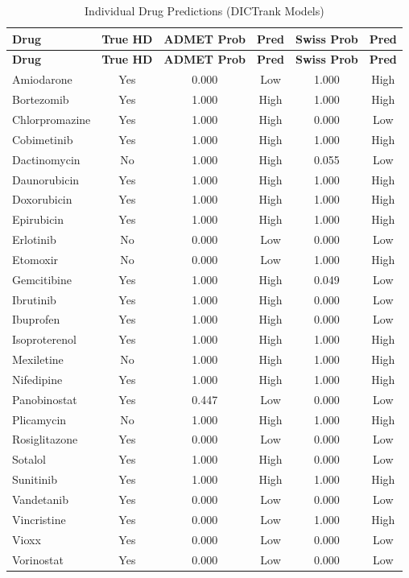 \documentclass[11pt]{article}
\begin{document}
\begin{longtable}{lccccc}
\caption{Individual Drug Predictions (DICTrank Models)} \\
\toprule
\textbf{Drug} & \textbf{True HD} & \textbf{ADMET Prob} & \textbf{Pred} & \textbf{Swiss Prob} & \textbf{Pred} \\
\midrule
\endfirsthead
\toprule
\textbf{Drug} & \textbf{True HD} & \textbf{ADMET Prob} & \textbf{Pred} & \textbf{Swiss Prob} & \textbf{Pred} \\
\midrule
\endhead
    Amiodarone & Yes & 0.000 & Low & 1.000 & High \\
    Bortezomib & Yes & 1.000 & High & 1.000 & High \\
    Chlorpromazine & Yes & 1.000 & High & 0.000 & Low \\
    Cobimetinib & Yes & 1.000 & High & 1.000 & High \\
    Dactinomycin & No & 1.000 & High & 0.055 & Low \\
    Daunorubicin & Yes & 1.000 & High & 1.000 & High \\
    Doxorubicin & Yes & 1.000 & High & 1.000 & High \\
    Epirubicin & Yes & 1.000 & High & 1.000 & High \\
    Erlotinib & No & 0.000 & Low & 0.000 & Low \\
    Etomoxir & No & 0.000 & Low & 1.000 & High \\
    Gemcitibine & Yes & 1.000 & High & 0.049 & Low \\
    Ibrutinib & Yes & 1.000 & High & 0.000 & Low \\
    Ibuprofen & Yes & 1.000 & High & 0.000 & Low \\
    Isoproterenol & Yes & 1.000 & High & 1.000 & High \\
    Mexiletine & No & 1.000 & High & 1.000 & High \\
    Nifedipine & Yes & 1.000 & High & 1.000 & High \\
    Panobinostat & Yes & 0.447 & Low & 0.000 & Low \\
    Plicamycin & No & 1.000 & High & 1.000 & High \\
    Rosiglitazone & Yes & 0.000 & Low & 0.000 & Low \\
    Sotalol & Yes & 1.000 & High & 0.000 & Low \\
    Sunitinib & Yes & 1.000 & High & 1.000 & High \\
    Vandetanib & Yes & 0.000 & Low & 0.000 & Low \\
    Vincristine & Yes & 0.000 & Low & 1.000 & High \\
    Vioxx & Yes & 0.000 & Low & 0.000 & Low \\
    Vorinostat & Yes & 0.000 & Low & 0.000 & Low \\
\bottomrule
\end{longtable}
\end{document}
